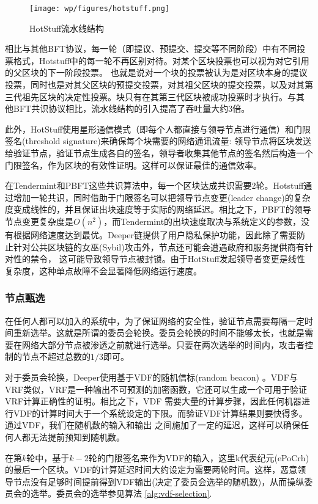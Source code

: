 \documentclass[a4paper]{article}
\begin{document}
\begin{figure}[hhhh]
\centering
\texttt{[image: wp/figures/hotstuff.png]}
\caption{HotStuff流水线结构}
\label{fig:hotstuff}
\end{figure}

相比与其他BFT协议，每一轮（即提议、预提交、提交等不同阶段）中有不同投票格式，Hotstuff中的每一轮不再区别对待。对某个区块投票也可以视为对它引用的父区块的下一阶段投票。 也就是说对一个块的投票被认为是对区块本身的提议投票，同时也是对其父区块的预提交投票，对其祖父区块的提交投票，以及对其第三代祖先区块的决定性投票。块只有在其第三代区块被成功投票时才执行。与其 他BFT共识协议相比，流水线结构的引入提高了吞吐量大约3倍。

此外，HotStuff使用星形通信模式（即每个人都直接与领导节点进行通信）和门限签名(threshold signature)来确保每个块需要的网络通讯流量: 领导节点将区块发送给验证节点，验证节点生成各自的签名，领导者收集其他节点的签名然后构造一个门限签名，作为区块的有效性证明。这样可以保证最佳的通信效率。

在Tendermint和PBFT这些共识算法中，每一个区块达成共识需要2轮。Hotstuff通过增加一轮共识，同时借助于门限签名可以把领导节点变更(leader change)的复杂度变成线性的，并且保证出块速度等于实际的网络延迟。相比之下，PBFT的领导节点变更复杂度是$O(n^2)$，而Tendermint的出块速度取决与系统定义的参数，没有根据网络速度达到最优。Deeper链提供了用户隐私保护功能，因此除了需要防止针对公共区块链的女巫(Sybil)攻击外，节点还可能会遭遇政府和服务提供商有针对性的禁令， 这可能导致领导节点被封锁。由于HotStuff发起领导者变更是线性复杂度，这种单点故障不会显著降低网络运行速度。

\subsubsection{节点甄选}
在任何人都可以加入的系统中，为了保证网络的安全性，验证节点需要每隔一定时间重新选举。这就是所谓的委员会轮换。委员会轮换的时间不能够太长，也就是需要在网络大部分节点被渗透之前就进行选举。只要在两次选举的时间内，攻击者控制的节点不超过总数的$1/3$即可。

对于委员会轮换，Deeper使用基于VDF的随机信标(random beacon) \cite{boneh2018verifiable}。VDF与VRF类似，VRF是一种输出不可预测的加密函数，它还可以生成一个可用于验证VRF计算正确性的证明。相比之下，VDF 需要大量的计算步骤，因此任何机器进行VDF的计算时间大于一个系统设定的下限。而验证VDF计算结果则要快得多。通过VDF，我们在随机数的输入和输出
之间施加了一定的延迟，这样可以确保任何人都无法提前预知到随机数。

在第$k$轮中，基于$k-2$轮的门限签名来作为VDF的输入，这里k代表纪元(ePoCrh)的最后一个区块。VDF的计算延迟时间大约设定为需要两轮时间。这样，恶意领导节点没有足够时间提前得到VDF输出(决定了委员会选举的随机数)，从而操纵委员会的选举。委员会的选举参见算法 \ref{alg:vdf-selection}.
\end{document}
